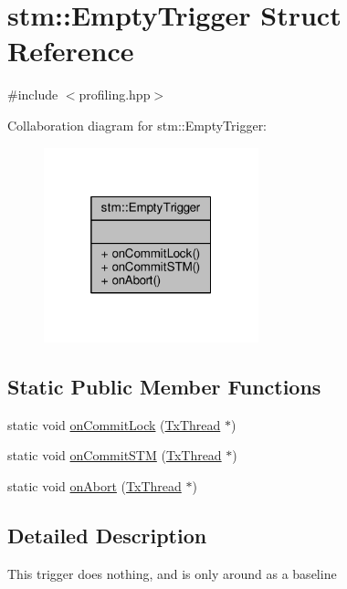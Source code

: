\hypertarget{structstm_1_1EmptyTrigger}{\section{stm\-:\-:Empty\-Trigger Struct Reference}
\label{structstm_1_1EmptyTrigger}
}


{\ttfamily \#include $<$profiling.\-hpp$>$}



Collaboration diagram for stm\-:\-:Empty\-Trigger\-:
\nopagebreak
\begin{figure}[H]
\begin{center}
\leavevmode
\includegraphics[width=176pt]{structstm_1_1EmptyTrigger__coll__graph}
\end{center}
\end{figure}
\subsection*{Static Public Member Functions}
\begin{DoxyCompactItemize}
\item 
static void \hyperlink{structstm_1_1EmptyTrigger_ace51400e566675d94676b32e48cdd881}{on\-Commit\-Lock} (\hyperlink{structstm_1_1TxThread}{Tx\-Thread} $\ast$)
\item 
static void \hyperlink{structstm_1_1EmptyTrigger_a6d9494426871febd6ebe421f0e888170}{on\-Commit\-S\-T\-M} (\hyperlink{structstm_1_1TxThread}{Tx\-Thread} $\ast$)
\item 
static void \hyperlink{structstm_1_1EmptyTrigger_a2dc113a96ff8ba05c67931821bd4f736}{on\-Abort} (\hyperlink{structstm_1_1TxThread}{Tx\-Thread} $\ast$)
\end{DoxyCompactItemize}


\subsection{Detailed Description}
This trigger does nothing, and is only around as a baseline 

